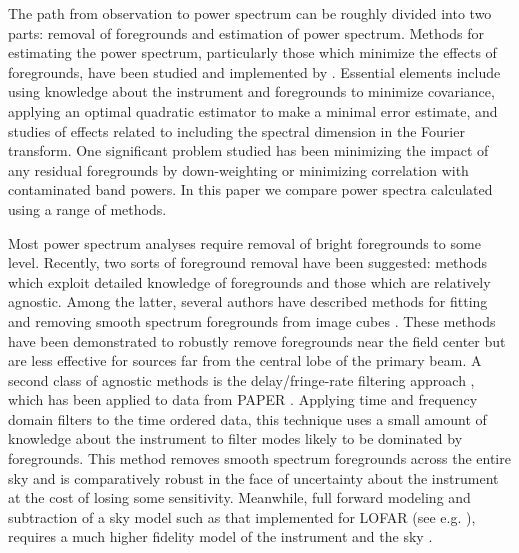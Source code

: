 \documentclass[twolcolumn,iop]{emulateapj}
\begin{document}
The path from observation to power spectrum can be roughly divided into two parts: removal of foregrounds and estimation of power spectrum. 
Methods for estimating the power spectrum, particularly those which minimize the effects of foregrounds, have been studied and implemented by \citet{Morales:2006p1870,Morales:2012p8790,Dillon:2013p10497,Dillon:2014p9788,Liu:2011p8763,Liu:2014p10462,Liu:2014p10463,Trott:2012p10466}. Essential elements include using knowledge about the instrument and foregrounds to minimize covariance, applying an optimal quadratic estimator to make a minimal error estimate, and studies of effects related to including the spectral dimension in the Fourier transform.  One significant problem studied has been minimizing the impact of any residual foregrounds by down-weighting or minimizing correlation with contaminated band powers. In this paper we compare power spectra calculated using a range of methods. 

Most power spectrum analyses require removal of bright foregrounds to some level.  Recently, two sorts of foreground removal have been suggested: methods which exploit detailed knowledge of foregrounds and those which are relatively agnostic. Among the latter, several authors have described methods for fitting and removing smooth spectrum foregrounds from image cubes  \cite{Morales:2006p1903,Bowman:2009p7816,Liu:2009p4762,Liu:2011p8763,Chapman:2013p10379,Dillon:2013p10497,Yatawatta:2013p9699}. These methods have been demonstrated to robustly remove foregrounds near the field center but are less effective for sources far from the central lobe of the primary beam.  A second class of agnostic methods is the delay/fringe-rate filtering approach \citep{Parsons:2012p8896,Liu:2014p10462,Liu:2014p10463}, which has been applied to data from PAPER \citep{Parsons:2014p10499}.  Applying time and frequency domain filters to the time ordered data, this technique uses a small amount of knowledge about the instrument to filter modes likely to be dominated by foregrounds.  This method removes smooth spectrum foregrounds across the entire sky and is comparatively robust in the face of uncertainty about the instrument at the cost of losing some sensitivity.  Meanwhile, full forward modeling and subtraction of a sky model such as that implemented for LOFAR (see e.g. \cite{Jelic:2008p2130,Yatawatta:2013p9699}), requires a much higher fidelity model of the instrument and the sky \citep{Datta:2010p8781,Vedantham:2012p10297}.
\end{document}
